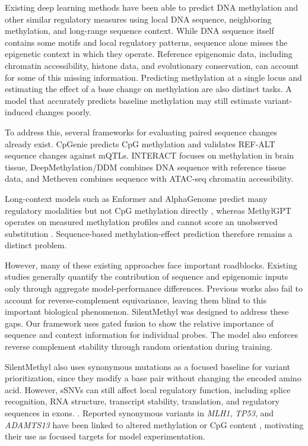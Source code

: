 \documentclass[10pt,letterpaper,twocolumn]{article}
\begin{document}
Existing deep learning methods have been able to predict DNA methylation and other similar regulatory measures using local DNA sequence, neighboring methylation, and long-range sequence context\cite{angermueller2017deepcpg,zhou2015predicting,avsec2021effective}. While DNA sequence itself contains some motifs and local regulatory patterns, sequence alone misses the epigenetic context in which they operate. Reference epigenomic data, including chromatin accessibility, histone data, and evolutionary conservation, can account for some of this missing information. Predicting methylation at a single locus and estimating the effect of a base change on methylation are also distinct tasks. A model that accurately predicts baseline methylation may still estimate variant-induced changes poorly.

To address this, several frameworks for evaluating paired sequence changes already exist. CpGenie predicts CpG methylation and validates REF-ALT sequence changes against mQTLs\cite{zeng2017cpgenie}. INTERACT focuses on methylation in brain tissue, DeepMethylation/DDM combines DNA sequence with reference tissue data, and Metheven combines sequence with ATAC-seq chromatin accessibility\cite{zhou2022interact,li2026deepmethylation,liu2025methven}.

{\color{addedred}
Long-context models such as Enformer and AlphaGenome predict many regulatory
modalities but not CpG methylation directly
\cite{avsec2021effective,avsec2025alphagenome}, whereas MethylGPT operates on
measured methylation profiles and cannot score an unobserved substitution
\cite{ying2024methylgpt}. Sequence-based methylation-effect prediction therefore
remains a distinct problem.
}

However, many of these existing approaches face important roadblocks. Existing studies generally quantify the contribution of sequence and epigenomic inputs only through aggregate model-performance differences. Previous works also fail to account for reverse-complement equivariance, leaving them blind to this important biological phenomenon\cite{mallet2021rc}. SilentMethyl was designed to address these gaps. Our framework uses gated fusion to show the relative importance of sequence and context information for individual probes. The model also enforces reverse complement stability through random orientation during training.

SilentMethyl also uses synonymous mutations as a focused baseline for variant prioritization, since they modify a base pair without changing the encoded amino acid. However, sSNVs can still affect local regulatory function, including splice recognition, RNA structure, transcript stability, translation, and regulatory sequences in exons. \cite{sauna2011understanding,stergachis2013exonic}.
Reported synonymous variants in \textit{MLH1}, \textit{TP53}, and
\textit{ADAMTS13} have been linked to altered methylation or CpG content
\cite{alvarez2025mlh1,blackburn2016tp53,jankowska2022adamts13}, motivating their
use as focused targets for model experimentation.
\end{document}
